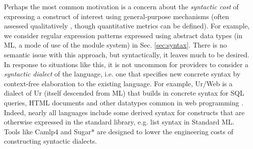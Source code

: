 Perhaps the most common motivation is a concern about the \emph{syntactic cost} of expressing a construct of interest using general-purpose mechanisms (often assessed qualitatively \cite{green1996usability}, though quantitative metrics can be defined). For example, we consider regular expression patterns expressed using abstract data types (in ML,  a mode of use of the module system) in Sec. \ref{sec:syntax}. There is no semantic issue with this approach, but syntactically, it leaves much to be desired. In response to situations like this, it is not uncommon for providers to consider a \emph{syntactic dialect} of the language, i.e. one that specifies new concrete syntax by context-free elaboration to the existing language. For example, Ur/Web is a dialect of Ur (itself descended from ML) that builds in concrete syntax for SQL queries, HTML documents and other datatypes common in web programming \cite{conf/popl/Chlipala15}. Indeed, nearly all languages include some derived syntax for constructs that are otherwise expressed in the standard library, e.g. list syntax in Standard ML. Tools like Camlp4 \cite{ocaml-manual} and Sugar* \cite{erdweg2011sugarj,erdweg2013framework} are designed to lower the engineering costs of constructing syntactic dialects. 


